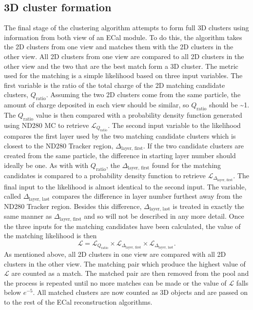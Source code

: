 \subsection{3D cluster formation}
\label{subsec:ECal3DMatching}
The final stage of the clustering algorithm attempts to form full 3D clusters using information from both view of an ECal module.  To do this, the algorithm takes the 2D clusters from one view and matches them with the 2D clusters in the other view.  All 2D clusters from one view are compared to all 2D clusters in the other view and the two that are the best match form a 3D cluster.  The metric used for the matching is a simple likelihood based on three input variables.  The first variable is the ratio of the total charge of the 2D matching candidate clusters, $Q_{\textrm{ratio}}$.  Assuming the two 2D clusters come from the same particle, the amount of charge deposited in each view should be similar, so $Q_{\textrm{ratio}}$ should be \sim1.  The $Q_{\textrm{ratio}}$ value is then compared with a probability density function generated using ND280 MC to retrieve $\mathcal{L}_{Q_{\textrm{ratio}}}$.  The second input variable to the likelihood compares the first layer used by the two matching candidate clusters which is closest to the ND280 Tracker region, $\Delta_{\textrm{layer, first}}$.  If the two candidate clusters are created from the same particle, the difference in starting layer number should ideally be one.  As with with $Q_{\textrm{ratio}}$, the $\Delta_{\textrm{layer, first}}$ found for the matching candidates is compared to a probability density function to retrieve $\mathcal{L}_{\Delta_{\textrm{layer, first}}}$.  The final input to the likelihood is almost identical to the second input.  The variable, called $\Delta_{\textrm{layer, last}}$ compares the difference in layer number furthest away from the ND280 Tracker region.  Besides this difference, $\Delta_{\textrm{layer, last}}$ is treated in exactly the same manner as $\Delta_{\textrm{layer, first}}$ and so will not be described in any more detail.
\newline
Once the three inputs for the matching candidates have been calculated, the value of the matching likelihood is then
\begin{equation}
  \mathcal{L} = \mathcal{L}_{Q_{\textrm{ratio}}} \times \mathcal{L}_{\Delta_{\textrm{layer, first}}} \times \mathcal{L}_{\Delta_{\textrm{layer, last}}}.
\end{equation}
As mentioned above, all 2D clusters in one view are compared with all 2D clusters in the other view.  The matching pair which produce the highest value of $\mathcal{L}$ are counted as a match.  The matched pair are then removed from the pool and the process is repeated until no more matches can be made or the value of $\mathcal{L}$ falls below $e^{-5}$.  All matched clusters are now counted as 3D objects and are passed on to the rest of the ECal reconstruction algorithms.

